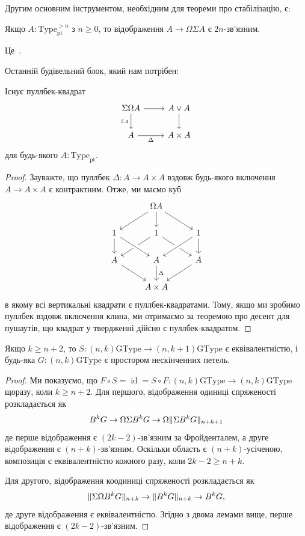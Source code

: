 \documentclass[12pt]{article}
\newcommand*{\Loop}{\Omega}
\newcommand*{\susp}[1]{{\Sigma}{#1}}
\newcommand*{\pt}{{\mathrm{pt}}}
\DeclarePairedDelimiter\trunc{\lVert}{\rVert}
\DeclareMathOperator\id{id}
\newcommand*{\Type}{\mathrm{Type}}
\newcommand*{\GType}{\mathrm{GType}}
\newcommand*{\leanref}[1]{{\normalfont[\texttt{\color{DarkBlue}#1}]}}
\begin{document}
Другим основним інструментом, необхідним для теореми про стабілізацію, є:
\begin{theorem}[Фройденталя]
  Якщо $A : \Type_\pt^{>n}$ з $n \ge 0$, то відображення $A \to \Loop\susp A$ є $2n$-зв'язним.
\end{theorem}
Це~\cite[Теорема~8.6.4]{TheBook}.

Останній будівельний блок, який нам потрібен:
\begin{lemma}
  Існує пуллбек-квадрат
  \[
    \begin{tikzcd}
      \susp\Loop A \ar[d,"\varepsilon_A"']\ar[r] & A \vee A \ar[d] \\
      A \ar[r,"\Delta"'] & A \times A
    \end{tikzcd}
  \]
  для будь-якого $A : \Type_\pt$.
\end{lemma}

\begin{proof}
Зауважте, що пуллбек $\Delta : A \to A \times A$ вздовж будь-якого включення $A \to A \times A$ є контрактним. Отже, ми маємо куб
\begin{equation*}
\begin{tikzcd}
& \Loop A \arrow[dl] \arrow[d] \arrow[dr] \\
1 \arrow[d] & 1 \arrow[dl] \arrow[dr] & 1 \arrow[dl,crossing over] \arrow[d] \\
A \arrow[dr] & A \arrow[d,"\Delta"] \arrow[from=ul,crossing over] & A \arrow[dl] \\
& A \times A
\end{tikzcd}
\end{equation*}
в якому всі вертикальні квадрати є пуллбек-квадратами. Тому, якщо ми зробимо пуллбек вздовж включення клина, ми отримаємо за теоремою про десент для пушаутів, що квадрат у твердженні дійсно є пуллбек-квадратом.
\end{proof}

\begin{theorem}[Стабілізація]
  \label{thm:stabilization}
  Якщо $k \ge n+2$, то $S : (n,k)\GType \to (n,k+1)\GType$ є еквівалентністю, і будь-яка $G : (n,k)\GType$ є простором нескінченних петель. \leanref{stabilization}
\end{theorem}

\begin{proof}
  Ми показуємо, що $F \circ S = \id = S \circ F : (n,k)\GType \to (n,k)\GType$ щоразу, коли $k \ge n+2$. Для першого, відображення одиниці спряженості розкладається як
  \[
    B^kG \to \Loop\susp B^kG \to \Loop\trunc{\susp B^kG}_{n+k+1}
  \]
  де перше відображення є $(2k-2)$-зв'язним за Фройденталем, а друге відображення є $(n+k)$-зв'язним. Оскільки область є $(n+k)$-усіченою, композиція є еквівалентністю кожного разу, коли $2k-2 \ge n+k$.

  Для другого, відображення коодиниці спряженості розкладається як
  \[
    \trunc{\susp\Loop B^kG}_{n+k} \to \trunc{B^kG}_{n+k} \to B^kG,
  \]
  де друге відображення є еквівалентністю. Згідно з двома лемами вище, перше відображення є $(2k-2)$-зв'язним.
\end{proof}
\end{document}

